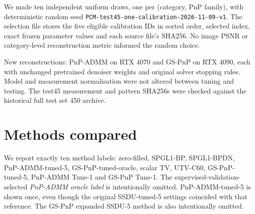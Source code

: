 \documentclass[10pt,a4paper]{article}
\begin{document}
We made ten independent uniform draws, one per
(category, PnP family), with deterministic random seed
\texttt{PCM-test45-one-calibration-2026-11-09-v1}.
The selection file stores the five eligible calibration IDs
in sorted order, selected index, exact frozen parameter values
and each source file's SHA256. No image PSNR or category-level
reconstruction metric informed the random choice.

\begin{table}[H]
\centering\tiny
{}
\caption{One calibration configuration randomly drawn from five
validation-tuned choices in each category. Each SSDU risk is the
held-out measurement-prediction error for that individual
validation acquisition, not an image-space test MSE.}
\end{table}

New reconstructions: PnP-ADMM on RTX 4070 and GS-PnP
on RTX 4090, each with unchanged pretrained denoiser weights
and original solver stopping rules. Model and measurement
normalisation were not altered between tuning and testing.
The test45 measurement and pattern SHA256s were checked against
the historical full test set 450 archive.

\section{Methods compared}
We report exactly ten method labels:
zero-filled, SPGL1-BP, SPGL1-BPDN, PnP-ADMM-tuned-5,
GS-PnP-tuned-oracle, scalar TV, UTV-C60,
GS-PnP-tuned-5, PnP-ADMM Tune-1 and GS-PnP Tune-1.
The supervised-validation-selected \emph{PnP-ADMM oracle label}
is intentionally omitted. PnP-ADMM-tuned-5 is shown once,
even though the original SSDU-tuned-5 settings coincided with
that reference. The GS-PnP expanded SSDU-5 method is also
intentionally omitted.
\end{document}
